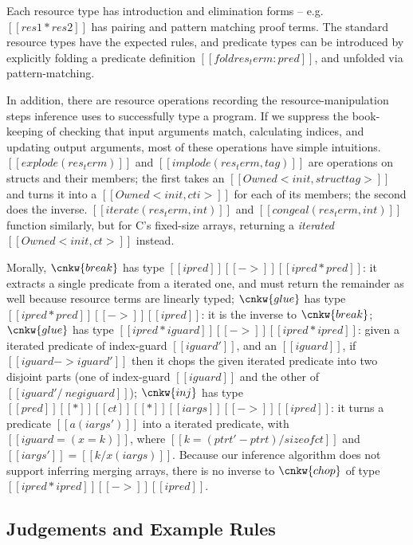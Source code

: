 \documentclass[11pt]{article}%
\begin{document}
Each resource type has introduction and elimination forms -- e.g.
$[[ res1 * res2 ]]$ has pairing and pattern matching proof terms. The
standard resource types have the expected rules, and predicate types
can be introduced by explicitly folding a predicate definition
$[[ fold res_term : pred ]]$, and unfolded via pattern-matching.


In addition, there are resource operations recording the
resource-manipulation steps inference uses to successfully type a
program.  If we suppress the book-keeping of checking that input
arguments match, calculating indices, and updating output arguments,
most of these operations have simple intuitions.
%
$[[ explode ( res_term ) ]]$ and $[[ implode ( res_term , tag ) ]]$
are operations on structs and their members; the first takes an
$[[ Owned < init , struct tag > ]]$ and turns it into a
$[[ Owned < init , cti > ]]$ for each of its members; the second does the
inverse.  $[[ iterate ( res_term , int ) ]]$ and
$[[ congeal ( res_term , int ) ]]$ function similarly, but for C's
fixed-size arrays, returning a \emph{iterated} $[[ Owned < init , ct > ]]$
instead.

Morally,
$\cnkw{break}$ has type $[[ ipred ]] [[ -> ]] [[ ipred * pred ]]$: it
extracts a single predicate from a iterated one, and must return the
remainder as well because resource terms are linearly typed;
$\cnkw{glue}$ has type $[[ ipred * pred ]] [[ -> ]] [[ ipred ]]$: it
is the inverse to $\cnkw{break}$; $\cnkw{glue}$ has type
$[[ ipred * iguard ]] [[ -> ]] [[ ipred * ipred ]]$: given a
iterated predicate of index-guard $[[ iguard' ]]$, and an
$[[ iguard ]]$, if $[[ iguard -> iguard' ]]$ then it chops the given
iterated predicate into two disjoint parts (one of index-guard
$[[ iguard ]]$ and the other of $[[ iguard' /\ neg iguard ]]$);
$\cnkw{inj}$ has type
$[[ pred ]] [[ * ]] [[ ct ]] [[ * ]] [[ iargs ]] [[ -> ]] [[ ipred ]]$:
it turns a predicate $[[ a ( iargs' ) ]]$ into a iterated
predicate, with $[[ iguard = ( x = k ) ]]$, where
$[[ k = ( ptrt' - ptrt ) / sizeof ct ]]$ and
$[[ iargs' ]] = [[ k / x ( iargs ) ]]$. Because our inference
algorithm does not support inferring merging
arrays, there is no inverse to
$\cnkw{chop}$ of type $[[ ipred * ipred ]] [[ -> ]] [[ ipred ]]$.

\subsection{Judgements and Example Rules}
\label{subsec:judgm_eg_rules}
\end{document}
